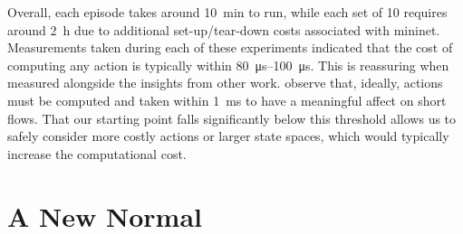 \documentclass[conference, letterpaper, 10pt, times]{IEEEtran}
\begin{document}
Overall, each episode takes around \SI{10}{\minute} to run, while each set of \num{10} requires around \SI{2}{\hour} due to additional set-up/tear-down costs associated with mininet.
Measurements taken during each of these experiments indicated that the cost of computing any action is typically within \SIrange{80}{100}{\micro\second}.
This is reassuring when measured alongside the insights from other work.
\Textcite{DBLP:conf/sigcomm/ChenL0L18} observe that, ideally, actions must be computed and taken within \SI{1}{\milli\second} to have a meaningful affect on short flows.
That our starting point falls significantly below this threshold allows us to safely consider more costly actions or larger state spaces, which would typically increase the computational cost.

%

\section{A New Normal}\label{sec:a-new-normal}

%
\end{document}
